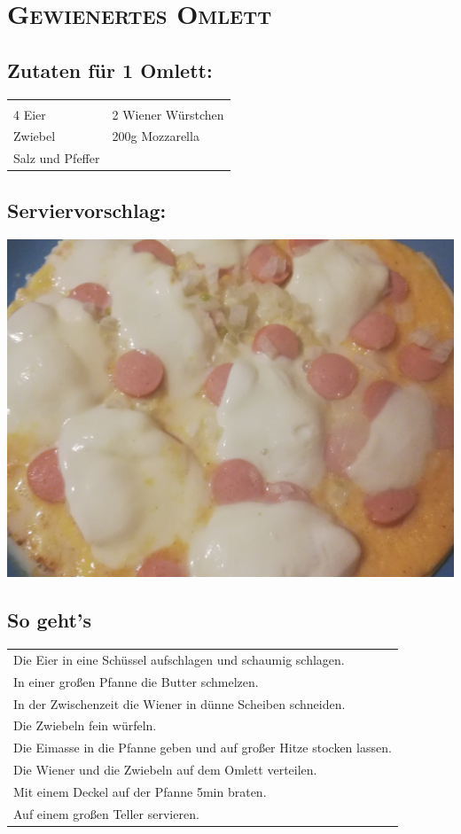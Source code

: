 \section{\textsc{Gewienertes Omlett}}

\subsection*{Zutaten für 1 Omlett:}

\begin{tabular}{p{7.5cm} p{7.5cm}}
	& \\
	4 Eier & 2 Wiener Würstchen \\
	\sfrac{1}{2} Zwiebel & 200g Mozzarella \\
	Salz und Pfeffer &
\end{tabular}

\subsection*{Serviervorschlag:}

\includegraphics[width=\textwidth]{img/omlett/omlett_wiener_fertig.jpg} \cite{omlettwiener}

\subsection*{So geht's}

\begin{tabular}{p{15cm}}
	Die Eier in eine Schüssel aufschlagen und schaumig schlagen.\\
	In einer großen Pfanne die Butter schmelzen.\\
	In der Zwischenzeit die Wiener in dünne Scheiben schneiden.\\
	Die Zwiebeln fein würfeln.\\
	Die Eimasse in die Pfanne geben und auf großer Hitze stocken lassen.\\
	Die Wiener und die Zwiebeln auf dem Omlett verteilen.\\
	Mit einem Deckel auf der Pfanne 5min braten.\\
	Auf einem großen Teller servieren.
\end{tabular}
